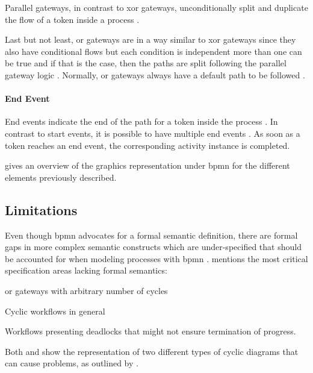 Parallel gateways, in contrast to \gls{xor} gateways, unconditionally split and duplicate the flow of a token inside a process \citep{Silver2011}.

Last but not least, \gls{or} gateways are in a way similar to \gls{xor} gateways since they also have conditional flows but each condition is independent \ie more than one can be true and if that is the case, then the paths are split following the parallel gateway logic \citep{Silver2011}. Normally, \gls{or} gateways always have a default path to be followed \citep{Silver2011}.

\paragraph{End Event}

End events indicate the end of the path for a token inside the process \citep{Silver2011}. In contrast to start events, it is possible to have multiple end events \citep{Silver2011}. As soon as a token reaches an end event, the corresponding activity instance is completed.

 gives an overview of the graphics representation under \gls{bpmn} for the different elements previously described.


\subsection{ Limitations}

Even though \gls{bpmn} advocates for a formal semantic definition, there are formal gaps in more complex semantic constructs which are under-specified that should be accounted for when modeling processes with \gls{bpmn} \citep{Soerensen2005}. \citet{Soerensen2005} mentions the most critical specification areas lacking formal semantics:
\begin{enumerate*}
	\item \gls{or} gateways with arbitrary number of cycles
	\item Cyclic workflows in general
	\item Workflows presenting deadlocks that might not ensure termination of progress.
\end{enumerate*}

Both  and  show the representation of two different types of cyclic diagrams that can cause problems, as outlined by \citet{Soerensen2005}.

